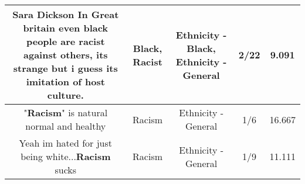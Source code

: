 \documentclass[11pt]{article}
\newlength\mylength
\begin{document}
\begin{center}
\begin{longtable}{|C{.65\mylength}|C{.30\mylength}|C{.12\mylength}|C{.12\mylength}|C{.12\mylength}|}
  \small Sara Dickson In Great britain even \textbf{black} people are \textbf{racist} against others, its strange but i guess its  imitation of host culture.\normalsize   & Black, Racist & Ethnicity - Black, Ethnicity - General & 2/22 & 9.091 \\  \hline
  \small "\textbf{Racism}" is natural normal and healthy\normalsize   & Racism & Ethnicity - General & 1/6 & 16.667 \\  \hline
  \small Yeah im hated for just being white...\textbf{Racism} sucks\normalsize   & Racism & Ethnicity - General & 1/9 & 11.111 \\  \hline

\end{longtable}
\end{center}
\end{document}
